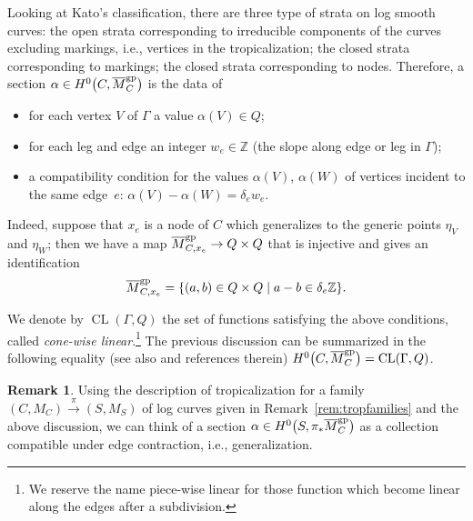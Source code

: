 \documentclass[pdftex]{sigma}
\numberwithin{equation}{section}
\theoremstyle{definition}
\newtheorem{remarkk}[theo]{Remark}
\begin{document}
Looking at Kato's classification, there are three type of strata on log smooth curves: the open strata corresponding to irreducible components of the curves excluding markings, i.e., vertices in the tropicalization; the closed strata corresponding to markings; the closed strata corresponding to nodes. Therefore, a section $\alpha\in H^0\bigl(C,\overline{M}_C^{\rm gp}\bigr)$ is the data of
\begin{itemize}\itemsep=0pt
 \item for each vertex $V$ of $\Gamma$ a value $\alpha(V)\in Q$;
 \item for each leg and edge an integer $w_e\in\mathbb Z$ (the slope along edge or leg in $\Gamma$);
 \item a compatibility condition for the values $\alpha(V)$, $\alpha(W)$ of vertices incident to the same edge~$e$: $\alpha(V)-\alpha(W)=\delta_e w_e$.
\end{itemize}
Indeed, suppose that $x_e$ is a node
of $C$ which generalizes to the generic points $\eta_V$ and $\eta_W$; then we have a map
$\overline{M}_{C,x_e}^{\rm gp}\to Q\times Q$
that is injective and gives an identification
\[\overline{M}_{C,x_e}^{\rm gp}=\{(a,b)\in Q\times Q \mid a-b\in\delta_e\mathbb Z\}.\]

We denote by $\operatorname{CL}(\Gamma,Q)$ the set of functions satisfying the above conditions, called \textit{cone-wise linear}.\footnote{We reserve the name piece-wise linear for those function which become linear along the edges after a subdivision.} The previous discussion can be summarized in the following equality (see also \cite[Section~3.3.3]{marcuswiselog} and references therein)
$H^0\bigl(C,\overline{M}_C^{\rm gp}\bigr)=\operatorname{CL}(\Gamma,Q)$.

 \begin{remarkk}
 Using the description of tropicalization for a family $(C,M_C)\xrightarrow{\pi}(S,M_S)$ of log curves given in Remark~\ref{rem:tropfamilies} and the above discussion, we can think of a section $ \alpha\in H^0\bigl(S,\pi_*\overline{M}_C^{\rm gp}\bigr)$ as a collection  compatible under edge contraction, i.e., generalization.
 \end{remarkk}
\end{document}
